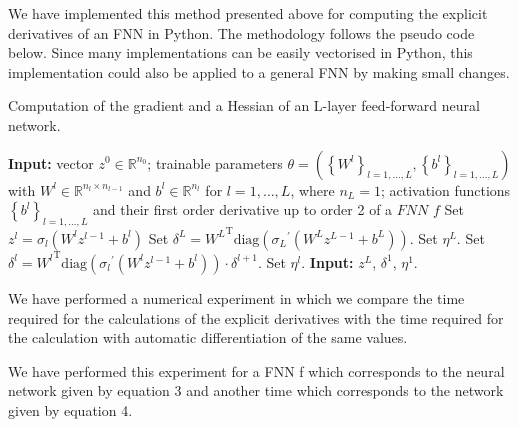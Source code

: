We have implemented this method presented above for computing the explicit derivatives of an FNN in Python. The methodology follows the pseudo code below. Since many implementations can be easily vectorised in Python, this implementation could also be applied to a general FNN by making small changes.
\begin{algorithm}[H]
    \caption{Computation of the gradient and a Hessian of an L-layer feed-forward neural network.}
    \begin{algorithmic}[1]
        \State \textbf{Input:} vector $z^0 \in \mathbb{R}^{n_0}$; trainable parameters $\theta = \left(\left\{ W^l \right\}_{l = 1, \ldots, L}, \left\{ b^l \right\}_{l = 1, \ldots, L}\right)$ with $W^l \in \mathbb{R}^{n_l \times n_{l-1}}$ and $b^l \in \mathbb{R}^{n_l}$ for $l = 1, \ldots, L$, where $n_L = 1$; activation functions $\left\{ b^l \right\}_{l = 1, \ldots, L}$ and their first order derivative up to order 2 of a $FNN$ $f$
            \State Set $z^l = \sigma_l\left(W^l z^{l-1} + b^l\right)$
        \EndFor
        \State Set $\delta^{L} = {W^{L}}^{\mathrm{T}} \mathrm{diag}\left({\sigma_{L}}^{\prime}\left(W^{L} z^{L-1} + b^{L}\right)\right)$.
        \State Set $\eta^{L}$.
            \State Set $\delta^{l} = {W^{l}}^{\mathrm{T}} \mathrm{diag}\left({\sigma_{l}}^{\prime}\left(W^{l} z^{l-1} + b^{l}\right)\right) \cdot \delta^{l+1}$.
            \State Set $\eta^{l}$.
        \EndFor
        \State \textbf{Input:} $z^L$, $\delta^1$, $\eta^1$.
    \end{algorithmic}
\end{algorithm}
We have performed a numerical experiment in which we compare the time required for the calculations of the explicit derivatives with the time required for the calculation with automatic differentiation of the same values. 

We have performed this experiment for a FNN f which corresponds to the neural network given by equation 3 and another time which corresponds to the network given by equation 4. 

\begin{table}[H]\label{tab:advs ecplicit}
    \caption{Comparison of different types of neural networks.}
\end{table}




